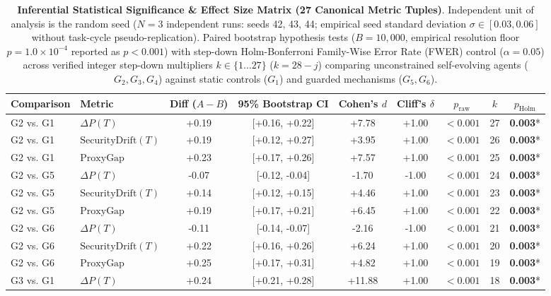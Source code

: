 \begin{table}[t]
\centering
\small
\caption{\textbf{Inferential Statistical Significance & Effect Size Matrix (27 Canonical Metric Tuples)}. Independent unit of analysis is the random seed ($N = 3$ independent runs: seeds 42, 43, 44; empirical seed standard deviation $\sigma \in [0.03, 0.06]$ without task-cycle pseudo-replication). Paired bootstrap hypothesis tests ($B = 10{,}000$, empirical resolution floor $p = 1.0 \times 10^{-4}$ reported as $p < 0.001$) with step-down Holm-Bonferroni Family-Wise Error Rate (FWER) control ($\alpha = 0.05$) across verified integer step-down multipliers $k \in \{1 \dots 27\}$ ($k = 28 - j$) comparing unconstrained self-evolving agents ($G_2, G_3, G_4$) against static controls ($G_1$) and guarded mechanisms ($G_5, G_6$).}
\label{tab:significance_testing}
\begin{tabular}{llccccccc}
\toprule
\textbf{Comparison} & \textbf{Metric} & \textbf{Diff ($A - B$)} & \textbf{95\% Bootstrap CI} & \textbf{Cohen's $d$} & \textbf{Cliff's $\delta$} & \textbf{$p_{\text{raw}}$} & \textbf{$k$} & \textbf{$p_{\text{Holm}}$} \\
\midrule
G2 vs. G1 & $\Delta P(T)$ & +0.19 & [+0.16, +0.22] & +7.78 & +1.00 & $<0.001$ & 27 & \textbf{0.003}* \\
G2 vs. G1 & $\text{SecurityDrift}(T)$ & +0.19 & [+0.12, +0.27] & +3.95 & +1.00 & $<0.001$ & 26 & \textbf{0.003}* \\
G2 vs. G1 & $\text{ProxyGap}$ & +0.23 & [+0.17, +0.26] & +7.57 & +1.00 & $<0.001$ & 25 & \textbf{0.003}* \\
G2 vs. G5 & $\Delta P(T)$ & -0.07 & [-0.12, -0.04] & -1.70 & -1.00 & $<0.001$ & 24 & \textbf{0.003}* \\
G2 vs. G5 & $\text{SecurityDrift}(T)$ & +0.14 & [+0.12, +0.15] & +4.46 & +1.00 & $<0.001$ & 23 & \textbf{0.003}* \\
G2 vs. G5 & $\text{ProxyGap}$ & +0.19 & [+0.17, +0.21] & +6.45 & +1.00 & $<0.001$ & 22 & \textbf{0.003}* \\
G2 vs. G6 & $\Delta P(T)$ & -0.11 & [-0.14, -0.07] & -2.16 & -1.00 & $<0.001$ & 21 & \textbf{0.003}* \\
G2 vs. G6 & $\text{SecurityDrift}(T)$ & +0.22 & [+0.16, +0.26] & +6.24 & +1.00 & $<0.001$ & 20 & \textbf{0.003}* \\
G2 vs. G6 & $\text{ProxyGap}$ & +0.25 & [+0.17, +0.31] & +4.82 & +1.00 & $<0.001$ & 19 & \textbf{0.003}* \\
G3 vs. G1 & $\Delta P(T)$ & +0.24 & [+0.21, +0.28] & +11.88 & +1.00 & $<0.001$ & 18 & \textbf{0.003}* \\

\end{tabular}
\end{table}
